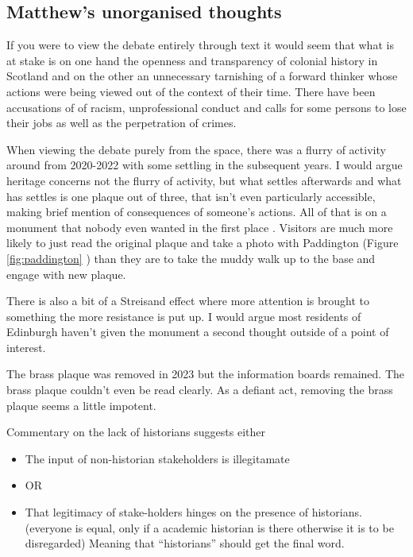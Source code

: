 \documentclass{scrartcl}
\begin{document}
\subsection{Matthew's unorganised thoughts}

If you were to view the debate entirely through text it would seem that what is at stake is on one hand the openness and transparency of colonial history in Scotland and on the other an unnecessary tarnishing of a forward thinker whose actions were being viewed out of the context of their time. There have been accusations of of racism, unprofessional conduct and calls for some persons to lose their jobs as well as the perpetration of crimes.

When viewing the debate purely from the space, there was a flurry of activity around from 2020-2022 with some settling in the subsequent years. I would argue heritage concerns not the flurry of activity, but what settles afterwards and what has settles is one plaque out of three, that isn't even particularly accessible, making brief mention of consequences of someone's actions. All of that is on a monument that nobody even wanted in the first place \cite{godard_2018}.  Visitors are much more likely to just read the original plaque and take a photo with Paddington (Figure \ref{fig:paddington} ) than they are to take the muddy walk up to the base and engage with new plaque.

There is also a bit of a Streisand effect where more attention is brought to something the more resistance is put up. I would argue most residents of Edinburgh haven't given the monument a second thought outside of a point of interest.

The brass plaque was removed in 2023 but the information boards remained. The brass plaque couldn't even be read clearly. As a defiant act, removing the brass plaque seems a little impotent.

Commentary on the lack of historians suggests either

\begin{itemize}
    \item The input of non-historian stakeholders is illegitamate
    \item OR
    \item That legitimacy of stake-holders hinges on the presence of historians. (everyone is equal, only if a academic historian is there otherwise it is to be disregarded) Meaning that ``historians'' should get the final word.
\end{itemize}
\end{document}
